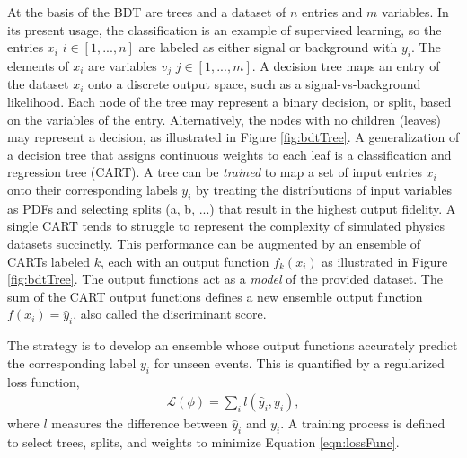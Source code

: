 At the basis of the BDT are trees and a dataset of $n$ entries and $m$ variables.
In its present usage, the classification is an example of supervised learning, so the entries $x_i$ $i\in[1,...,n]$ are labeled as either signal or background with $y_i$.
The elements of $x_i$ are variables $v_j$ $j\in[1,...,m]$.
A decision tree maps an entry of the dataset $x_i$ onto a discrete output space, such as a signal-vs-background likelihood.
Each node of the tree may represent a binary decision, or split, based on the variables of the entry.
Alternatively, the nodes with no children (leaves) may represent a decision, as illustrated in Figure \ref{fig:bdtTree}.
A generalization of a decision tree that assigns continuous weights to each leaf is a classification and regression tree (CART).
A tree can be \emph{trained} to map a set of input entries $x_i$ onto their corresponding labels $y_i$ by treating the distributions of input variables as PDFs and selecting splits (a, b, ...) that result in the highest output fidelity.
A single CART tends to struggle to represent the complexity of simulated physics datasets succinctly.
This performance can be augmented by an ensemble of CARTs labeled $k$, each with an output function $f_k(x_i)$ as illustrated in Figure \ref{fig:bdtTree}.
The output functions act as a \emph{model} of the provided dataset.
The sum of the CART output functions defines a new ensemble output function $f(x_i)=\hat{y}_i$, also called the discriminant score.

The strategy is to develop an ensemble whose output functions accurately predict the corresponding label $y_i$ for unseen events.
This is quantified by a regularized loss function,
\begin{equation}\begin{split}\label{eqn:lossFunc}
    \mathcal{L}(\phi)=\sum_i l(\hat{y}_i,y_i),
\end{split}\end{equation} 
where $l$ measures the difference between $\hat{y}_i$ and $y_i$.
A training process is defined to select trees, splits, and weights to minimize Equation \ref{eqn:lossFunc}.

